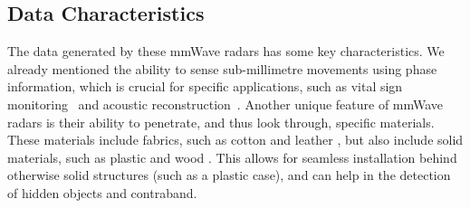 \subsection{Data Characteristics}
\label{subsection: background - millimetre wave radar - data characteristics}


The data generated by these mmWave radars has some key characteristics.
We already mentioned the ability to sense sub-millimetre movements using phase information, which is crucial for specific applications, such as vital sign monitoring~\cite{wang2023here} and acoustic reconstruction~\cite{li2025acoustic}.
Another unique feature of mmWave radars is their ability to penetrate, and thus look through, specific materials.
These materials include fabrics, such as cotton and leather \cite{meier2020propagation}, but also include solid materials, such as plastic and wood \cite{kapilevich2011fmcw}.
This allows for seamless installation behind otherwise solid structures (such as a plastic case), and can help in the detection of hidden objects and contraband.


